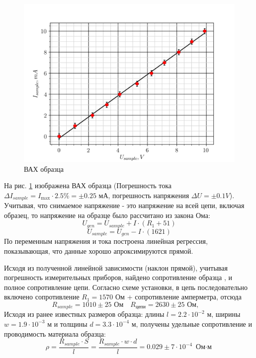 \begin{figure}[h!]
	\centering
	\includegraphics[width = .9\linewidth]{graphs/voltamp.png}
	\caption{ВАХ образца}
	\label{fig:5.2}
\end{figure}

На рис. \ref{fig:5.2} изображена ВАХ образца (Погрешность тока $\Delta I_{sample} = I_{\max}\cdot 2.5\% = \pm 0.25
\text{ мА}$, погрешность напряжения $\Delta U = \pm 0.1 V$). Учитывая, что снимаемое напряжение - это напряжение на всей цепи, включая
образец, то напряжение на образце было рассчитано из закона Ома:
\begin{equation}
		U_{gen} = U_{sample} + I \cdot (R_1+51)
\end{equation}
\begin{equation}
	U_{sample} = U_{gen} - I \cdot (1621)
\end{equation}
По переменным напряжения и тока построена линейная регрессия,
показывающая, что данные хорошо апроксимируются прямой.


Исходя из полученной линейной зависимости (наклон прямой), учитывая погрешность измерительных приборов, найдено сопротивление образца , и
полное сопротивление цепи. Согласно схеме установки, в цепь последовательно включено сопротивление $R_1=1570$ Ом +
сопротивление амперметра, отсюда
\begin{equation}
	R_{sample}=1010 \pm25 \text{ Ом} \quad
	R_\text{цепи}=2630 \pm25 \text{ Ом}, \quad
\end{equation}
Исходя из ранее известных размеров образца: длины $l=2.2\cdot 10^{-2}$ м, ширины  $w=1.9\cdot 10^{-3}$ м и толщины $d=3.3\cdot 10^{-4} $ м, получены удельные сопротивление и проводимость материала образца:
\begin{equation}
	\rho=\frac{R_{sample}\cdot S}{l}=\frac{R_{sample}\cdot w \cdot d}{l}=
	0.029\pm 7 \cdot 10^{-4} \text{ Ом$\cdot$м}
\end{equation}

